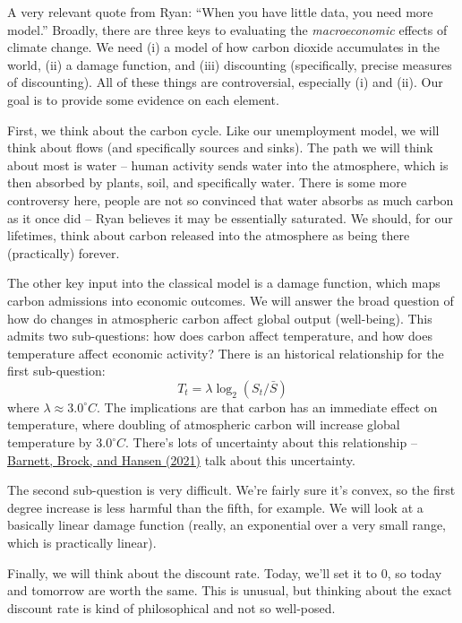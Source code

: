 \documentclass[10pt]{article}
\begin{document}
A very relevant quote from Ryan: ``When you have little data, you need more model.''
 Broadly, there are three keys to evaluating the \emph{macroeconomic} effects of climate change. We need (i) a model of how carbon dioxide accumulates in the world, (ii) a damage function, and (iii) discounting (specifically, precise measures of discounting). All of these things are controversial, especially (i) and (ii). Our goal is to provide some evidence on each element.
	
	First, we think about the carbon cycle. Like our unemployment model, we will think about flows (and specifically sources and sinks). The path we will think about most is water -- human activity sends water into the atmosphere, which is then absorbed by plants, soil, and specifically water. There is some more controversy here, people are not so convinced that water absorbs as much carbon as it once did -- Ryan believes it may be essentially saturated. We should, for our lifetimes, think about carbon released into the atmosphere as being there (practically) forever.
	
	The other key input into the classical model is a damage function, which maps carbon admissions into economic outcomes. We will answer the broad question of how do changes in atmospheric carbon affect global output (\ie well-being). This admits two sub-questions: how does carbon affect temperature, and how does temperature affect economic activity? There is an historical relationship for the first sub-question:
	\[
	T_t = \lambda \log_2 (S_t / \bar{S})
	\]
	where $\lambda \approx 3.0^\circ C$. The implications are that carbon has an immediate effect on temperature, where doubling of atmospheric carbon will increase global temperature by $3.0^\circ C$. There's lots of uncertainty about this relationship -- \href{https://www.nber.org/papers/w29064}{Barnett, Brock, and Hansen (2021)} talk about this uncertainty. 
	
	The second sub-question is very difficult. We're fairly sure it's convex, so the first degree increase is less harmful than the fifth, for example. We will look at a basically linear damage function (really, an exponential over a very small range, which is practically linear).
	
	Finally, we will think about the discount rate. Today, we'll set it to 0, so today and tomorrow are worth the same. This is unusual, but thinking about the exact discount rate is kind of philosophical and not so well-posed.
	
\end{document}
